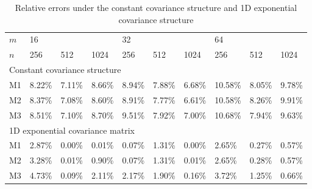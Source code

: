 \begin{table}[ht]
	\centering
	{
		\begin{tabular}{@{}llllllllll@{}}
			\toprule
			$m$ 	& \multicolumn{3}{l}{16} & \multicolumn{3}{l}{32} & \multicolumn{3}{l}{64}  \\
			$n$ 	& 256 & 512 & 1024 & 256 & 512 & 1024 & 256 & 512 & 1024 \\ \bottomrule
			
			\multicolumn{10}{l}{Constant covariance structure} \\ \midrule

			M1 & 8.22\% & 7.11\% & 8.66\% & 8.94\% & 7.88\% & 6.68\% & 10.58\% & 8.05\% & 9.78\% \\
			M2 & 8.37\% & 7.08\% & 8.60\% & 8.91\% & 7.77\% & 6.61\% & 10.58\% & 8.26\% & 9.91\% \\
			M3 & 8.51\% & 7.10\% & 8.70\% & 9.51\% & 7.92\% & 7.00\% & 10.68\% & 7.94\% & 9.63\% \\

			\midrule
			
			\multicolumn{10}{l}{1D exponential covariance matrix} \\ \midrule

			M1 & 2.87\% & 0.00\% & 0.01\% & 0.07\% & 1.31\% & 0.00\% & 2.65\% & 0.27\% & 0.57\% \\
			M2 & 3.28\% & 0.01\% & 0.90\% & 0.07\% & 1.31\% & 0.01\% & 2.65\% & 0.28\% & 0.57\% \\
			M3 & 4.73\% & 0.09\% & 2.11\% & 2.17\% & 1.90\% & 0.16\% & 3.72\% & 1.25\% & 0.66\% \\
				
			\bottomrule
		\end{tabular}%
	}
	\caption{Relative errors under the constant covariance structure and 1D exponential covariance structure}
	\label{tab:table3}
\end{table}

